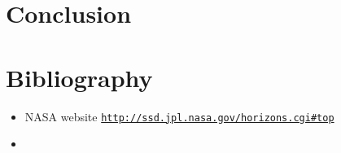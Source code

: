 \documentclass[a4paper, twoside, 11pt]{report}
\theoremstyle{theorem}
\theoremstyle{remark}
\theoremstyle{exemple}
\begin{document}
    \section{}
    
    \section{}
    
    

\chapter*{Conclusion}

    \paragraph{}
    
    
    
    
\chapter*{Bibliography}
    \begin{itemize}
        \item NASA website \href{{http://ssd.jpl.nasa.gov/horizons.cgi#top}}{\nolinkurl{http://ssd.jpl.nasa.gov/horizons.cgi\#top}}
        \item 
    \end{itemize}
    
    
    
    
    
    
    
    
    
    
\end{document}
